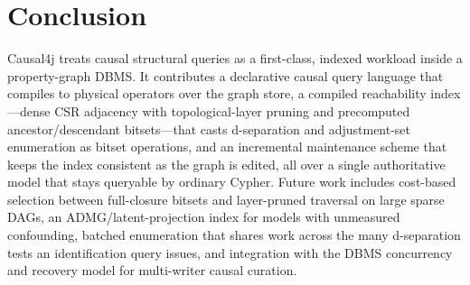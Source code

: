 \section{Conclusion}\label{sec:concl}

Causal4j treats causal structural queries as a first-class, indexed workload
inside a property-graph DBMS. It contributes a declarative causal query language
that compiles to physical operators over the graph store, a compiled reachability
index---dense CSR adjacency with topological-layer pruning and precomputed
ancestor/descendant bitsets---that casts d-separation and adjustment-set
enumeration as bitset operations, and an incremental maintenance scheme that keeps
the index consistent as the graph is edited, all over a single authoritative
model that stays queryable by ordinary Cypher. Future work includes cost-based
selection between full-closure bitsets and layer-pruned traversal on large sparse
DAGs, an ADMG/latent-projection index for models with unmeasured confounding,
batched enumeration that shares work across the many d-separation tests an
identification query issues, and integration with the DBMS concurrency and
recovery model for multi-writer causal curation.
